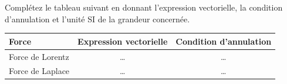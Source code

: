 \documentclass[11pt]{article}
\begin{document}
\begin{exercice}
Complétez le tableau suivant en donnant l'expression vectorielle, la condition d'annulation et l'unité SI de la grandeur concernée.

\begin{tabular}{|l|c|c|}
\hline
\textbf{Force} & \textbf{Expression vectorielle} & \textbf{Condition d'annulation} \\
\hline
Force de Lorentz & \ldots & \ldots \\
\hline
Force de Laplace & \ldots & \ldots \\
\hline
\end{tabular}
\end{exercice}
\end{document}
